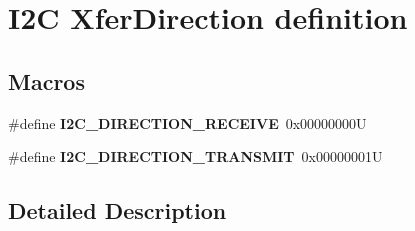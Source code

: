 \hypertarget{group___i2_c___xfer_direction__definition}{}\section{I2C Xfer\+Direction definition}
\label{group___i2_c___xfer_direction__definition}
\subsection*{Macros}
\begin{DoxyCompactItemize}
\item 
\mbox{\label{group___i2_c___xfer_direction__definition_gacfbbd511a4f68bbd9965d0e5a192e261}} 
\#define {\bfseries I2\+C\+\_\+\+D\+I\+R\+E\+C\+T\+I\+O\+N\+\_\+\+R\+E\+C\+E\+I\+VE}~0x00000000U
\item 
\mbox{\label{group___i2_c___xfer_direction__definition_ga4995d0291421b538d7859e998803c567}} 
\#define {\bfseries I2\+C\+\_\+\+D\+I\+R\+E\+C\+T\+I\+O\+N\+\_\+\+T\+R\+A\+N\+S\+M\+IT}~0x00000001U
\end{DoxyCompactItemize}


\subsection{Detailed Description}
